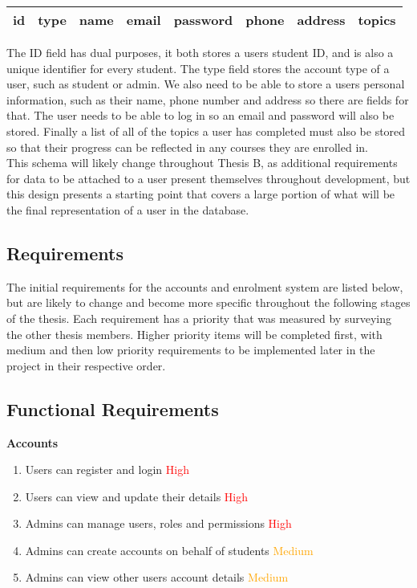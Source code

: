 \begin{center}
    \begin{tabular}{|c c c c c c c c|} 
        \hline
        id & type & name & email & password & phone & address & topics \\ [0.5ex] 
        \hline
    \end{tabular}
\end{center}

The ID field has dual purposes, it both stores a users student ID, and is also a unique identifier for every student. The type field stores the account type of a user, such as student or admin. We also need to be able to store a users personal information, such as their name, phone number and address so there are fields for that. The user needs to be able to log in so an email and password will also be stored. Finally a list of all of the topics a user has completed must also be stored so that their progress can be reflected in any courses they are enrolled in.\\

This schema will likely change throughout Thesis B, as additional requirements for data to be attached to a user present themselves throughout development, but this design presents a starting point that covers a large portion of what will be the final representation of a user in the database.

\subsection{Requirements}
The initial requirements for the accounts and enrolment system are listed below, but are likely to change and become more specific throughout the following stages of the thesis. Each requirement has a priority that was measured by surveying the other thesis members. Higher priority items will be completed first, with medium and then low priority requirements to be implemented later in the project in their respective order.

\subsection{Functional Requirements}
\textbf{Accounts}
    \begin{enumerate}
    \item Users can register and login \textcolor{Red}{High}
    \item Users can view and update their details \textcolor{Red}{High}
    \item Admins can manage users, roles and permissions \textcolor{Red}{High}
    \item Admins can create accounts on behalf of students \textcolor{Orange}{Medium}
    \item Admins can view other users account details \textcolor{Orange}{Medium}
    \end{enumerate}

